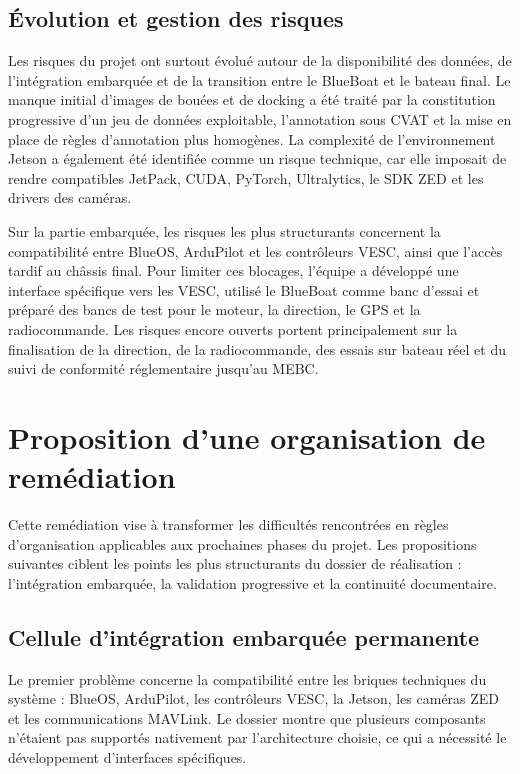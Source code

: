 \documentclass[11pt,letterpaper]{article}
\begin{document}
\subsection{Évolution et gestion des risques}
Les risques du projet ont surtout évolué autour de la disponibilité des données, de l'intégration embarquée et de la transition entre le BlueBoat et le bateau final. Le manque initial d'images de bouées et de docking a été traité par la constitution progressive d'un jeu de données exploitable, l'annotation sous CVAT et la mise en place de règles d'annotation plus homogènes. La complexité de l'environnement Jetson a également été identifiée comme un risque technique, car elle imposait de rendre compatibles JetPack, CUDA, PyTorch, Ultralytics, le SDK ZED et les drivers des caméras.

Sur la partie embarquée, les risques les plus structurants concernent la compatibilité entre BlueOS, ArduPilot et les contrôleurs VESC, ainsi que l'accès tardif au châssis final. Pour limiter ces blocages, l'équipe a développé une interface spécifique vers les VESC, utilisé le BlueBoat comme banc d'essai et préparé des bancs de test pour le moteur, la direction, le GPS et la radiocommande. Les risques encore ouverts portent principalement sur la finalisation de la direction, de la radiocommande, des essais sur bateau réel et du suivi de conformité réglementaire jusqu'au MEBC.

\section{Proposition d'une organisation de remédiation}

Cette remédiation vise à transformer les difficultés rencontrées en règles d'organisation applicables aux prochaines phases du projet. Les propositions suivantes ciblent les points les plus structurants du dossier de réalisation : l'intégration embarquée, la validation progressive et la continuité documentaire.

\subsection*{Cellule d'intégration embarquée permanente}
Le premier problème concerne la compatibilité entre les briques techniques du système : BlueOS, ArduPilot, les contrôleurs VESC, la Jetson, les caméras ZED et les communications MAVLink. Le dossier montre que plusieurs composants n'étaient pas supportés nativement par l'architecture choisie, ce qui a nécessité le développement d'interfaces spécifiques.
\end{document}
